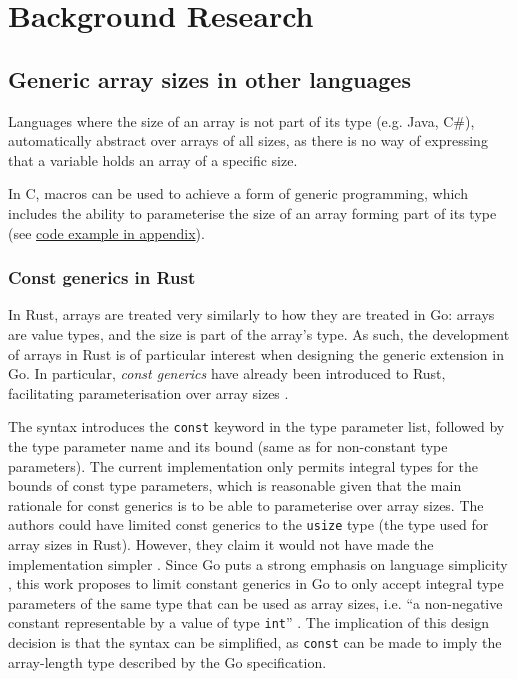 \section{Background Research}
\label{ch:background-research}

\subsection{Generic array sizes in other languages}

Languages where the size of an array is not part of its type (e.g. Java, C\#),
automatically abstract over arrays of all sizes, as there is no way of
expressing that a variable holds an array of a specific size.

In C, macros can be used to achieve a form of generic programming, which includes
the ability to parameterise the size of an array forming part of its type (see
\hyperref[sec:generic-c]{code example in appendix}).

\subsubsection{Const generics in Rust}

In Rust, arrays are treated very similarly to how they are treated in Go: arrays
are value types, and the size is part of the array's type. As such, the
development of arrays in Rust is of particular interest when designing the
generic extension in Go. In particular, \emph{const generics} have already been
introduced to Rust, facilitating parameterisation over array sizes
\autocite{rustConstBlog}.

The syntax introduces the \texttt{const} keyword in the type parameter list,
followed by the type parameter name and its bound (same as for non-constant type
parameters). The current implementation only permits integral types for the
bounds of const type parameters, which is reasonable given that the main
rationale for const generics is to be able to parameterise over array sizes. The
authors could have limited const generics to the \texttt{usize} type (the type
used for array sizes in Rust). However, they claim it would not have made the
implementation simpler \autocite{rustConstRFC}. Since Go puts a strong emphasis
on language simplicity \autocite{goSimplicity}, this work proposes to limit
constant generics in Go to only accept integral type parameters of the same type
that can be used as array sizes, i.e. ``a non-negative constant representable by
a value of type \texttt{int}'' \autocite{spec}. The implication of this design
decision is that the syntax can be simplified, as \texttt{const} can be made to
imply the array-length type described by the Go specification.

